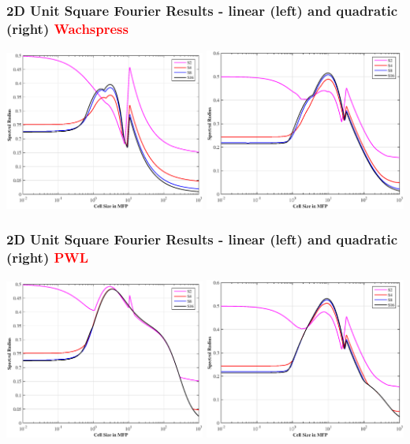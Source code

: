 \documentclass[compress,10pt]{beamer}
\newcommand{\tcr}[1]{\textcolor{red}{#1}}
\begin{document}
\begin{frame}[t]
{
\frametitle{\small 2D Unit Square Fourier Results - linear (left) and quadratic (right) \tcr{Wachspress}}
\vspace{1cm}
\includegraphics[width=0.495\textwidth]{images/SI_MIP_quad_C=4_UWACHSPRESS1_LS.eps}
\includegraphics[width=0.495\textwidth]{images/SI_MIP_quad_C=4_UWACHSPRESS2_LS.eps}
}
{
\frametitle{\small 2D Unit Square Fourier Results - linear (left) and quadratic (right) \tcr{PWL}}
\vspace{1cm}
\includegraphics[width=0.495\textwidth]{images/SI_MIP_quad_C=4_PWLD1_LS.eps}
\includegraphics[width=0.495\textwidth]{images/SI_MIP_quad_C=4_UPWLD2_LS.eps}
}
\end{frame}
\end{document}
